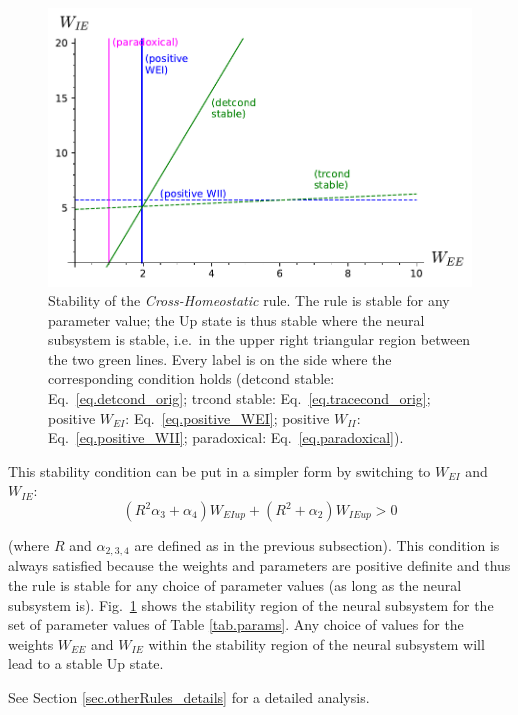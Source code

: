 \documentclass[twocolumn]{article}
\newcommand{\EE}{\mathit{EE}}
\newcommand{\EI}{\mathit{EI}}
\newcommand{\IE}{\mathit{IE}}
\newcommand{\II}{\mathit{II}}
\newcommand{\up}{\mathit{up}}
\begin{document}
\begin{figure}[ht]
\centering
\includegraphics[width=\linewidth]{CH_stability}
\caption{Stability of the {\em Cross-Homeostatic} rule. The rule is stable for any parameter value; the Up state is thus stable where the neural subsystem is stable, i.e.\ in the upper right triangular region between the two green lines. Every label is on the side where the corresponding condition  holds (detcond stable: Eq.\ \ref{eq.detcond_orig}; trcond stable: Eq.\ \ref{eq.tracecond_orig}; positive $W_{\EI}$: Eq.\ \ref{eq.positive_WEI}; positive $W_{\II}$: Eq.\ \ref{eq.positive_WII}; paradoxical: Eq.\ \ref{eq.paradoxical}).}
\label{fig.CH_stability}
\end{figure}




This stability condition can be put in a simpler form by switching to $W_{\EI}$ and $W_{\IE}$:
\begin{equation}
(R^2 \alpha_3 + \alpha_4) W_{\EI\up} + (R^2 + \alpha_2) W_{\IE\up} > 0
\label{eq.CH_stable_cond_v2}
\end{equation}

\noindent (where $R$ and $\alpha_{2,3,4}$ are defined as in the previous subsection). This condition is always satisfied because the weights and parameters are positive definite and thus the rule is stable for any choice of parameter values (as long as the neural subsystem is). Fig.\ \ref{fig.CH_stability} shows the stability region of the neural subsystem for the set of parameter values of Table \ref{tab.params}. Any choice of values for the weights $W_{\EE}$ and $W_{\IE}$ within the stability region of the neural subsystem will lead to a stable Up state.

See Section \ref{sec.otherRules_details} for a detailed analysis.
\end{document}
